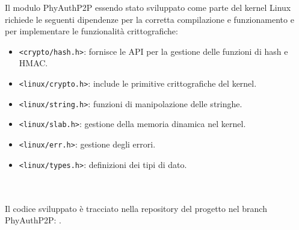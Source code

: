 Il modulo PhyAuthP2P essendo stato sviluppato come parte del kernel Linux richiede le seguenti dipendenze per la corretta compilazione e funzionamento e per implementare le funzionalità crittografiche:
\begin{itemize}
    \item \texttt{<crypto/hash.h>}: fornisce le API per la gestione delle funzioni di hash e HMAC.
    \item \texttt{<linux/crypto.h>}: include le primitive crittografiche del kernel.
    \item \texttt{<linux/string.h>}: funzioni di manipolazione delle stringhe.
    \item \texttt{<linux/slab.h>}: gestione della memoria dinamica nel kernel.
    \item \texttt{<linux/err.h>}: gestione degli errori.
    \item \texttt{<linux/types.h>}: definizioni dei tipi di dato.\\\\\\
\end{itemize}

\noindent Il codice sviluppato è tracciato nella repository del progetto nel branch PhyAuthP2P: \cite{site:openvlc-pa-github}.

